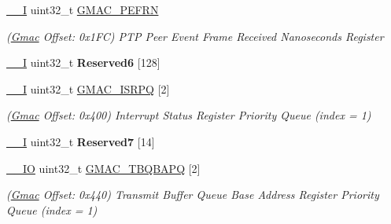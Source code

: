 \begin{DoxyCompactItemize}
\mbox{\label{structGmac_ad0967dbd44debd04a7597b6084408408}} 
\mbox{\hyperlink{core__cm7_8h_af63697ed9952cc71e1225efe205f6cd3}{\+\_\+\+\_\+I}} uint32\+\_\+t \mbox{\hyperlink{structGmac_ad0967dbd44debd04a7597b6084408408}{G\+M\+A\+C\+\_\+\+P\+E\+F\+RN}}
\begin{DoxyCompactList}\small\item\em (\mbox{\hyperlink{structGmac}{Gmac}} Offset\+: 0x1\+FC) P\+TP Peer Event Frame Received Nanoseconds Register \end{DoxyCompactList}\item 
\mbox{\label{structGmac_a500cb70fd9c9370673650dea36acce6a}} 
\mbox{\hyperlink{core__cm7_8h_af63697ed9952cc71e1225efe205f6cd3}{\+\_\+\+\_\+I}} uint32\+\_\+t {\bfseries Reserved6} \mbox{[}128\mbox{]}
\item 
\mbox{\label{structGmac_a35d785f4a5d3b8fe1805e80b300ab6ff}} 
\mbox{\hyperlink{core__cm7_8h_af63697ed9952cc71e1225efe205f6cd3}{\+\_\+\+\_\+I}} uint32\+\_\+t \mbox{\hyperlink{structGmac_a35d785f4a5d3b8fe1805e80b300ab6ff}{G\+M\+A\+C\+\_\+\+I\+S\+R\+PQ}} \mbox{[}2\mbox{]}
\begin{DoxyCompactList}\small\item\em (\mbox{\hyperlink{structGmac}{Gmac}} Offset\+: 0x400) Interrupt Status Register Priority Queue (index = 1) \end{DoxyCompactList}\item 
\mbox{\label{structGmac_a524fddee18cb390b2268a33d86d5049d}} 
\mbox{\hyperlink{core__cm7_8h_af63697ed9952cc71e1225efe205f6cd3}{\+\_\+\+\_\+I}} uint32\+\_\+t {\bfseries Reserved7} \mbox{[}14\mbox{]}
\item 
\mbox{\label{structGmac_a14750334c6261a50250811d09f93db14}} 
\mbox{\hyperlink{core__cm7_8h_aec43007d9998a0a0e01faede4133d6be}{\+\_\+\+\_\+\+IO}} uint32\+\_\+t \mbox{\hyperlink{structGmac_a14750334c6261a50250811d09f93db14}{G\+M\+A\+C\+\_\+\+T\+B\+Q\+B\+A\+PQ}} \mbox{[}2\mbox{]}
\begin{DoxyCompactList}\small\item\em (\mbox{\hyperlink{structGmac}{Gmac}} Offset\+: 0x440) Transmit Buffer Queue Base Address Register Priority Queue (index = 1) \end{DoxyCompactList}\item 
\mbox{\label{structGmac_a372441a29f0d4e2c299e39cbf2b20c19}} 

\end{DoxyCompactItemize}
